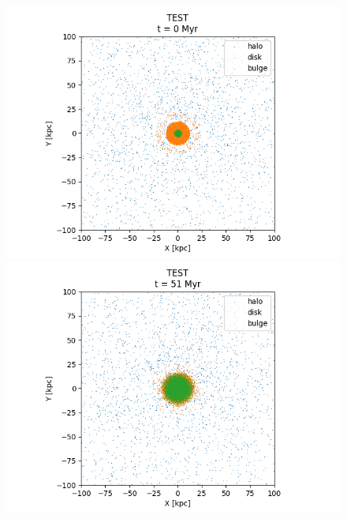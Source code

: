 \documentclass[a4paper,12pt, english]{article}
\begin{document}
\begin{figure}
\centering
\begin{minipage}{0.45\textwidth}
  \centering
\includegraphics[width=1\textwidth]{simulations-plots/mw_testrun_0000.png}
\end{minipage}
\begin{minipage}{0.45\textwidth}
  \centering
\includegraphics[width=1\textwidth]{simulations-plots/mw_testrun_0046.png}
\end{minipage}
\begin{minipage}{0.45\textwidth}
  \centering

\end{minipage}
\end{figure}
\end{document}
